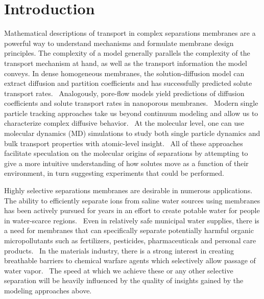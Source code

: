 \documentclass{article}
\begin{document}
  \section{Introduction}
  
  Mathematical descriptions of transport in complex separations membranes are 
  a powerful way to understand mechanisms and formulate membrane design principles. 
  \cite{vinh-thang_predictive_2013,geens_transport_2006,darvishmanesh_mass_2016}
  The complexity of a model generally parallels the complexity of the transport 
  mechanism at hand, as well as the transport information the model conveys.
  In dense homogeneous membranes, the solution-diffusion model can extract 
  diffusion and partition coefficients and has successfully predicted solute 
  transport rates.~\cite{wijmans_solution-diffusion_1995} Analogously, pore-flow
  models yield predictions of diffusion coefficients and solute transport rates 
  in nanoporous membranes.~\cite{paul_diffusive_1974} Modern single particle 
  tracking approaches take us beyond continuum modeling and allow us to 
  characterize complex diffusive behavior.~\cite{manzo_review_2015} At the molecular
  level, one can use molecular dynamics (MD) simulations to study both single 
  particle dynamics and bulk transport properties with atomic-level insight.~\cite{coscia_chemically_2019,maginn_best_2018}
  All of these approaches facilitate speculation on the molecular origins of separations
  by attempting to give a more intuitive understanding of how solutes move as a function
  of their environment, in turn suggesting experiments that could be performed.
  
  Highly selective separations membranes are desirable in numerous applications. 
  The ability to efficiently separate ions from saline water sources using membranes 
  has been actively pursued for years in an effort to create potable water for people 
  in water-scarce regions.~\cite{werber_materials_2016} Even in relatively safe
  municipal water supplies, there is a need for membranes that can specifically separate
  potentially harmful organic micropollutants such as fertilizers, pesticides, pharmaceuticals
  and personal care products.~\cite{barbosa_occurrence_2016} In the materials industry,
  there is a strong interest in creating breathable barriers to chemical warfare agents
  which selectively allow passage of water vapor.~\cite{mondloch_destruction_2015}
  The speed at which we achieve these or any other selective separation will be 
  heavily influenced by the quality of insights gained by the modeling approaches above.
\end{document}
